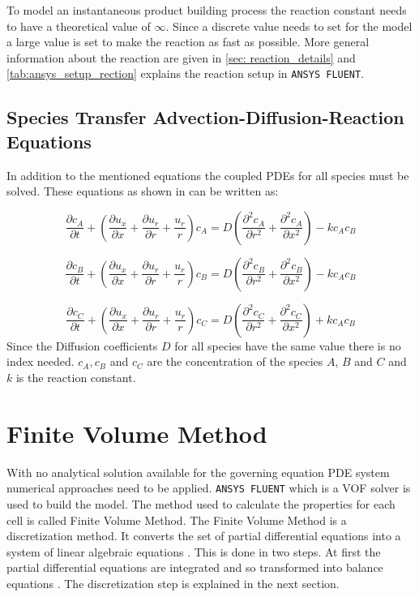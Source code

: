 \documentclass[../thesis.tex]{subfiles}
\begin{document}
To model an instantaneous product building process the reaction constant needs to have a theoretical value of $\infty$. Since a discrete value needs to set for the model a large value is set to make the reaction as fast as possible. More general information about the reaction are given in \autoref{sec: reaction_details} and \autoref{tab:ansys_setup_rection} explains the reaction setup in \texttt{ANSYS FLUENT}. 

\subsection{Species Transfer Advection-Diffusion-Reaction Equations}

In addition to the mentioned equations the coupled PDEs for all species must be solved. These equations as shown in \cite{comolli2021dynamics} can be written as:

\begin{equation}
	\dfrac{\partial c_A}{\partial t} + \left( \dfrac{\partial u_x}{ \partial x} + \dfrac{\partial u_r}{ \partial r} + \dfrac{u_r}{r} \right) c_A = D \left( \dfrac{\partial^2 c_A} {\partial r^2} + \dfrac{\partial^2 c_A}{\partial x^2} \right)  - kc_A c_B
\end{equation}

\begin{equation}
	\dfrac{\partial c_B}{\partial t} + \left( \dfrac{\partial u_x}{ \partial x} + \dfrac{\partial u_r}{ \partial r} + \dfrac{u_r}{r} \right) c_B =  D \left( \dfrac{\partial^2 c_B} {\partial r^2} + \dfrac{\partial^2 c_B}{\partial x^2} \right) - kc_A c_B
\end{equation}

\begin{equation}
	\dfrac{\partial c_C}{\partial t} + \left( \dfrac{\partial u_x}{ \partial x} + \dfrac{\partial u_r}{ \partial r} + \dfrac{u_r}{r} \right) c_C =  D \left( \dfrac{\partial^2 c_C} {\partial r^2} + \dfrac{\partial^2 c_C}{\partial x^2} \right) + kc_A c_B
\end{equation}
Since the Diffusion coefficients $D$ for all species have the same value there is no index needed. $c_A, c_B$ and $c_C$ are the concentration of the species $A$, $B$ and $C$ and $k$ is the reaction constant. 

\section{Finite Volume Method}
\label{sec: finite_volume}
With no analytical solution available for the governing equation PDE system numerical approaches need to be applied. \texttt{ANSYS FLUENT} which is a VOF solver is used to build the model. The method used to calculate the properties for each cell is called Finite Volume Method.
The Finite Volume Method is a discretization method. It converts the set of partial differential equations into a system of linear algebraic equations \cite{darwish2021finite}. This is done in two steps. At first the partial differential equations are integrated and so transformed into balance equations \cite{darwish2021finite}. The discretization step is explained in the next section.
\end{document}
